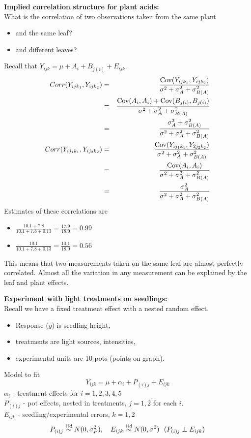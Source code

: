 \textbf{Implied correlation structure for plant acids:}\\
What is the correlation of two observations taken from the same plant
\begin{itemize}
\item and the same leaf?
\item and different leaves?
\end{itemize}
Recall that $Y_{ijk}=\mu + A_i + B_{j(i)} + E_{ijk}$.
\begin{eqnarray*}
Corr(Y_{ij k_1},Y_{ij k_2}) & = & \frac{\mbox{Cov}(Y_{ij k_1},Y_{ij k_2})} 
{\sigma^2 + \sigma_{A}^2 + \sigma_{B(A)}^2}\\
& = & \frac{\mbox{Cov}(A_i,A_i) + \mbox{Cov}(B_{j(i)}, B_{j(i)})}
{\sigma^2 + \sigma_{A}^2 + \sigma_{B(A)}^2}\\
& = & \frac{\sigma_A^2 + \sigma_{B(A)}^2}
{\sigma^2 + \sigma_{A}^2 + \sigma_{B(A)}^2}\\
Corr(Y_{i j_1 k_1},Y_{i j_2 k_2}) & = & \frac{\mbox{Cov}(Y_{i j_1 k_1},Y_{2 j_2 k_2})} 
{\sigma^2 + \sigma_{A}^2 + \sigma_{B(A)}^2}\\
& = & \frac{\mbox{Cov}(A_i,A_i)} 
{\sigma^2 + \sigma_{A}^2 + \sigma_{B(A)}^2}\\
& = & \frac{\sigma_A^2} 
{\sigma^2 + \sigma_{A}^2 + \sigma_{B(A)}^2}\\
\end{eqnarray*}
Estimates of these correlations are 
\begin{itemize}
\item $\frac{10.1+7.8}{10.1+7.8+0.13} = \frac{17.9}{18.0} = 0.99$
\item $\frac{10.1}{10.1+7.8+0.13} = \frac{10.1}{18.0} = 0.56$
\end{itemize}
This means that two measurements taken on the same leaf are almost perfectly correlated.  Almost all the variation in any measurement can be
explained by the leaf and plant effects.

\newpage

\textbf{Experiment with light treatments on seedlings:}\\
Recall we have a fixed treatment effect with a nested random effect.  
\begin{itemize}
\item Response ($y$) is seedling height, 
\item treatments are light sources, intensities,
\item experimental units are 10 pots (points on graph).
\end{itemize}
Model to fit
$$ Y_{ijk} = \mu + \alpha_i + P_{(i)j} + E_{ijk} $$
$\alpha_i$ - treatment effects for $i=1,2,3,4,5$ \\
$P_{(i)j}$ - pot effects, nested in treatments, $j=1,2$ for each $i$. \\
$E_{ijk}$ -  seedling/experimental errors, $k=1,2$
$$P_{(i)j} \iid N(0,\sigma_P^2), \ \ \ E_{ijk} \iid N(0,\sigma^2) \ \ (P_{(i)j} \perp E_{ijk})$$

